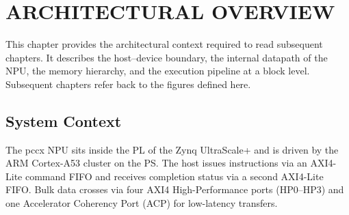 \documentclass[11pt,a4paper,twoside,openany]{report}
\begin{document}
\newpage

\chapter{ARCHITECTURAL OVERVIEW}

This chapter provides the architectural context required to read
subsequent chapters. It describes the host--device boundary, the
internal datapath of the NPU, the memory hierarchy, and the
execution pipeline at a block level. Subsequent chapters refer back
to the figures defined here.

\section{System Context}

The pccx NPU sits inside the PL of the Zynq UltraScale+ and is
driven by the ARM Cortex-A53 cluster on the PS. The host issues
instructions via an AXI4-Lite command FIFO and receives completion
status via a second AXI4-Lite FIFO. Bulk data crosses via four
AXI4 High-Performance ports (HP0--HP3) and one Accelerator Coherency
Port (ACP) for low-latency transfers.
\end{document}
